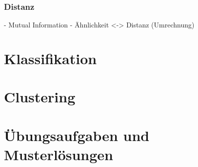 \documentclass[a4paper]{article}
\begin{document}
\begin{landscape}
\begin{multicols}{3}
            \subsubsection{Distanz}

        
        - Mutual Information
        - Ähnlichkeit <-> Distanz (Umrechnung)

    \section{Klassifikation}

    

    \section{Clustering}
    
    
    \end{multicols}

    \newpage
    \section*{Übungsaufgaben und Musterlösungen}
\end{landscape}
\end{document}
